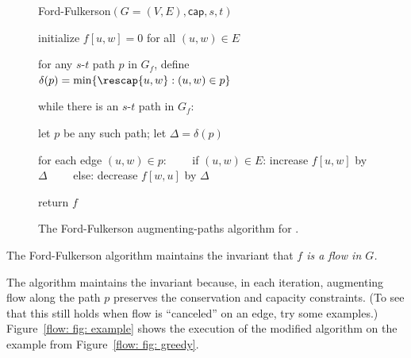 \begin{figure}
\begin{myframed}
\begin{steps}
  \item[] {\sf Ford-Fulkerson}$(G=(V,E), \textsf{cap}, s, t)$

    \step initialize $f[u, w] = 0$ for all $(u,w)\in E$

    \step for any $s$-$t$ path $p$ in $G_f$,
    define $\delta(p) = \min\{ \rescap {u,w} : (u,w) \in p\}$

    \step while there is an $s$-$t$ path in $G_f$:

    \begin{block}
      \step let $p$ be any such path; let $\Delta=\delta(p)$ 

      \step for each edge $(u,w)\in p$:
      \step~~~~if $(u,w)\in E$: increase $f[u,w]$ by $\Delta$
      \step~~~~else: decrease $f[w, u]$ by $\Delta$
    \end{block}

    \step return $f$
  \end{steps}
\end{myframed}
\caption{The Ford-Fulkerson augmenting-paths algorithm for .}\label{flow: fig: ffalg}
\end{figure}

\begin{observation}
  The Ford-Fulkerson algorithm
  maintains the invariant that \emph{$f$ is a flow in $G$.}
\end{observation}
The algorithm maintains the invariant because, in each iteration,
augmenting flow along the path $p$ 
preserves the conservation and capacity constraints.
(To see that this still holds when flow is ``canceled'' on an edge, try some examples.)
Figure~\ref{flow: fig: example} shows the execution of the modified algorithm
on the example from Figure~\ref{flow: fig: greedy}.

\smallskip

\newcommand{\XSCALE}{1.49}
\newcommand{\YSCALE}{0.95}

